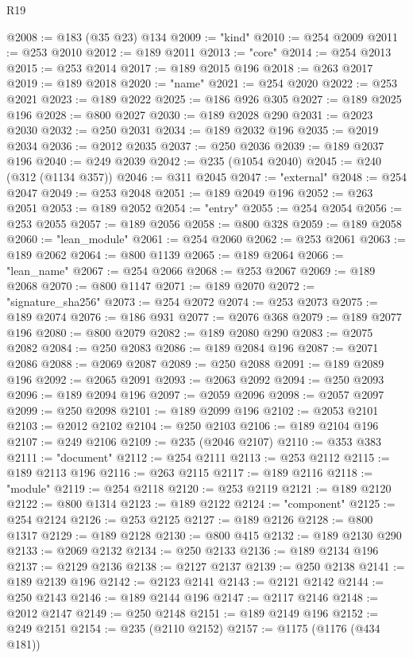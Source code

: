 \begin{lexlean}{R19}
\begin{coremodule}
@2008 := @183 (@35 @23) @134
@2009 := "kind"
@2010 := @254 @2009
@2011 := @253 @2010
@2012 := @189 @2011
@2013 := "core"
@2014 := @254 @2013
@2015 := @253 @2014
@2017 := @189 @2015 @196
@2018 := @263 @2017
@2019 := @189 @2018
@2020 := "name"
@2021 := @254 @2020
@2022 := @253 @2021
@2023 := @189 @2022
@2025 := @186 @926 @305
@2027 := @189 @2025 @196
@2028 := @800 @2027
@2030 := @189 @2028 @290
@2031 := @2023 @2030
@2032 := @250 @2031
@2034 := @189 @2032 @196
@2035 := @2019 @2034
@2036 := @2012 @2035
@2037 := @250 @2036
@2039 := @189 @2037 @196
@2040 := @249 @2039
@2042 := @235 (@1054 @2040)
@2045 := @240 (@312 (@1134 @357))
@2046 := @311 @2045
@2047 := "external"
@2048 := @254 @2047
@2049 := @253 @2048
@2051 := @189 @2049 @196
@2052 := @263 @2051
@2053 := @189 @2052
@2054 := "entry"
@2055 := @254 @2054
@2056 := @253 @2055
@2057 := @189 @2056
@2058 := @800 @328
@2059 := @189 @2058
@2060 := "lean_module"
@2061 := @254 @2060
@2062 := @253 @2061
@2063 := @189 @2062
@2064 := @800 @1139
@2065 := @189 @2064
@2066 := "lean_name"
@2067 := @254 @2066
@2068 := @253 @2067
@2069 := @189 @2068
@2070 := @800 @1147
@2071 := @189 @2070
@2072 := "signature_sha256"
@2073 := @254 @2072
@2074 := @253 @2073
@2075 := @189 @2074
@2076 := @186 @931
@2077 := @2076 @368
@2079 := @189 @2077 @196
@2080 := @800 @2079
@2082 := @189 @2080 @290
@2083 := @2075 @2082
@2084 := @250 @2083
@2086 := @189 @2084 @196
@2087 := @2071 @2086
@2088 := @2069 @2087
@2089 := @250 @2088
@2091 := @189 @2089 @196
@2092 := @2065 @2091
@2093 := @2063 @2092
@2094 := @250 @2093
@2096 := @189 @2094 @196
@2097 := @2059 @2096
@2098 := @2057 @2097
@2099 := @250 @2098
@2101 := @189 @2099 @196
@2102 := @2053 @2101
@2103 := @2012 @2102
@2104 := @250 @2103
@2106 := @189 @2104 @196
@2107 := @249 @2106
@2109 := @235 (@2046 @2107)
@2110 := @353 @383
@2111 := "document"
@2112 := @254 @2111
@2113 := @253 @2112
@2115 := @189 @2113 @196
@2116 := @263 @2115
@2117 := @189 @2116
@2118 := "module"
@2119 := @254 @2118
@2120 := @253 @2119
@2121 := @189 @2120
@2122 := @800 @1314
@2123 := @189 @2122
@2124 := "component"
@2125 := @254 @2124
@2126 := @253 @2125
@2127 := @189 @2126
@2128 := @800 @1317
@2129 := @189 @2128
@2130 := @800 @415
@2132 := @189 @2130 @290
@2133 := @2069 @2132
@2134 := @250 @2133
@2136 := @189 @2134 @196
@2137 := @2129 @2136
@2138 := @2127 @2137
@2139 := @250 @2138
@2141 := @189 @2139 @196
@2142 := @2123 @2141
@2143 := @2121 @2142
@2144 := @250 @2143
@2146 := @189 @2144 @196
@2147 := @2117 @2146
@2148 := @2012 @2147
@2149 := @250 @2148
@2151 := @189 @2149 @196
@2152 := @249 @2151
@2154 := @235 (@2110 @2152)
@2157 := @1175 (@1176 (@434 @181))

\end{coremodule}
\end{lexlean}
